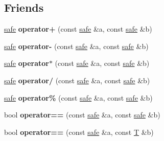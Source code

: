 \subsection*{Friends}
\begin{DoxyCompactItemize}
\item 
\mbox{\label{structfc_1_1safe_a73925fc0d0bee9b4c5e5120c38105aa9}} 
\mbox{\hyperlink{structfc_1_1safe}{safe}} {\bfseries operator+} (const \mbox{\hyperlink{structfc_1_1safe}{safe}} \&a, const \mbox{\hyperlink{structfc_1_1safe}{safe}} \&b)
\item 
\mbox{\label{structfc_1_1safe_a207f3bc22ef71357cec46322252fd35c}} 
\mbox{\hyperlink{structfc_1_1safe}{safe}} {\bfseries operator-\/} (const \mbox{\hyperlink{structfc_1_1safe}{safe}} \&a, const \mbox{\hyperlink{structfc_1_1safe}{safe}} \&b)
\item 
\mbox{\label{structfc_1_1safe_a2bcc04a45f973728648f7e774338372a}} 
\mbox{\hyperlink{structfc_1_1safe}{safe}} {\bfseries operator$\ast$} (const \mbox{\hyperlink{structfc_1_1safe}{safe}} \&a, const \mbox{\hyperlink{structfc_1_1safe}{safe}} \&b)
\item 
\mbox{\label{structfc_1_1safe_ae2d595f8e0727205d2bf1de5a3794d84}} 
\mbox{\hyperlink{structfc_1_1safe}{safe}} {\bfseries operator/} (const \mbox{\hyperlink{structfc_1_1safe}{safe}} \&a, const \mbox{\hyperlink{structfc_1_1safe}{safe}} \&b)
\item 
\mbox{\label{structfc_1_1safe_a1719fbdac240b537e660a085dc1b5a16}} 
\mbox{\hyperlink{structfc_1_1safe}{safe}} {\bfseries operator\%} (const \mbox{\hyperlink{structfc_1_1safe}{safe}} \&a, const \mbox{\hyperlink{structfc_1_1safe}{safe}} \&b)
\item 
\mbox{\label{structfc_1_1safe_a2c9bfcc98dc3983a839601190a4c9290}} 
bool {\bfseries operator==} (const \mbox{\hyperlink{structfc_1_1safe}{safe}} \&a, const \mbox{\hyperlink{structfc_1_1safe}{safe}} \&b)
\item 
\mbox{\label{structfc_1_1safe_a7b18b4c7d028784540c51a35b996e710}} 
bool {\bfseries operator==} (const \mbox{\hyperlink{structfc_1_1safe}{safe}} \&a, const \mbox{\hyperlink{struct_t}{T}} \&b)

\end{DoxyCompactItemize}
